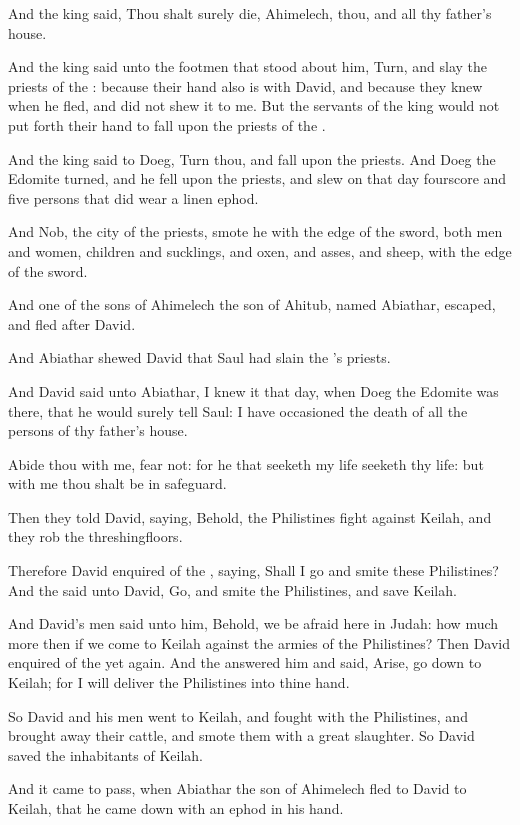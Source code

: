 \Verse And the king said, Thou shalt surely die, Ahimelech, thou, and all thy father's house.

\Verse And the king said unto the footmen that stood about him, Turn, and slay the priests of the \LORD: because their hand also is with David, and because they knew when he fled, and did not shew it to me.  But the servants of the king would not put forth their hand to fall upon the priests of the \LORD.

\Verse And the king said to Doeg, Turn thou, and fall upon the priests.  And Doeg the Edomite turned, and he fell upon the priests, and slew on that day fourscore and five persons that did wear a linen ephod.

\Verse And Nob, the city of the priests, smote he with the edge of the sword, both men and women, children and sucklings, and oxen, and asses, and sheep, with the edge of the sword.

\Verse And one of the sons of Ahimelech the son of Ahitub, named Abiathar, escaped, and fled after David.

\Verse And Abiathar shewed David that Saul had slain the \LORD's priests.

\Verse And David said unto Abiathar, I knew it that day, when Doeg the Edomite was there, that he would surely tell Saul: I have occasioned the death of all the persons of thy father's house.

\Verse Abide thou with me, fear not: for he that seeketh my life seeketh thy life: but with me thou shalt be in safeguard.


\Chapter
\Verse Then they told David, saying, Behold, the Philistines fight against Keilah, and they rob the threshingfloors.

\Verse Therefore David enquired of the \LORD, saying, Shall I go and smite these Philistines? And the \LORD said unto David, Go, and smite the Philistines, and save Keilah.

\Verse And David's men said unto him, Behold, we be afraid here in Judah: how much more then if we come to Keilah against the armies of the Philistines?  \Verse Then David enquired of the \LORD yet again. And the \LORD answered him and said, Arise, go down to Keilah; for I will deliver the Philistines into thine hand.

\Verse So David and his men went to Keilah, and fought with the Philistines, and brought away their cattle, and smote them with a great slaughter. So David saved the inhabitants of Keilah.

\Verse And it came to pass, when Abiathar the son of Ahimelech fled to David to Keilah, that he came down with an ephod in his hand.

